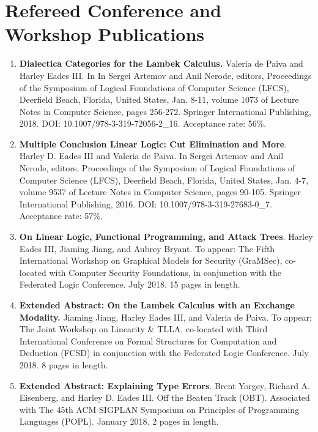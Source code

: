 \documentclass[11pt]{article}
\begin{document}
  \section{Refereed Conference and Workshop Publications}
  \label{subsec:symposium_publications}
  \begin{enumerate}
  \item[] \textbf{Dialectica Categories for the Lambek Calculus.}
    Valeria de Paiva and Harley Eades III. In In Sergei Artemov and
    Anil Nerode, editors, Proceedings of the Symposium of Logical
    Foundations of Computer Science (LFCS), Deerfield Beach, Florida,
    United States, Jan. 8-11, volume 1073 of Lecture Notes in Computer
    Science, pages 256-272. Springer International Publishing,
    2018. DOI: 10.1007/978-3-319-72056-2\_16.  Acceptance rate: 56\%.

  \item[] \textbf{Multiple Conclusion Linear Logic: Cut Elimination and
    More}.  Harley D. Eades III and Valeria de Paiva. In Sergei Artemov
    and Anil Nerode, editors, Proceedings of the Symposium of Logical
    Foundations of Computer Science (LFCS), Deerfield Beach, Florida,
    United States, Jan. 4-7, volume 9537 of Lecture Notes in Computer
    Science, pages 90-105. Springer International Publishing,
    2016. DOI: 10.1007/978-3-319-27683-0\_7.  Acceptance rate: 57\%.

  \item[] \textbf{On Linear Logic, Functional Programming, and Attack
    Trees}.  Harley Eades III, Jiaming Jiang, and Aubrey Bryant.  To
    appear: The Fifth International Workshop on Graphical Models for
    Security (GraMSec), co-located with Computer Security Foundations,
    in conjunction with the Federated Logic Conference. July 2018.  15
    pages in length.

  \item[] \textbf{Extended Abstract: On the Lambek Calculus with an
    Exchange Modality.}  Jiaming Jiang, Harley Eades III, and Valeria
    de Paiva. To appear: The Joint Workshop on Linearity \& TLLA,
    co-located with Third International Conference on Formal
    Structures for Computation and Deduction (FCSD) in conjunction
    with the Federated Logic Conference. July 2018. 8 pages in length.
    
  \item[] \textbf{Extended Abstract: Explaining Type Errors}.  Brent
    Yorgey, Richard A. Eisenberg, and Harley D. Eades III. Off the
    Beaten Track (OBT). Associated with The 45th ACM SIGPLAN Symposium
    on Principles of Programming Languages (POPL). January 2018. 2
    pages in length.
       

\end{enumerate}
\end{document}
